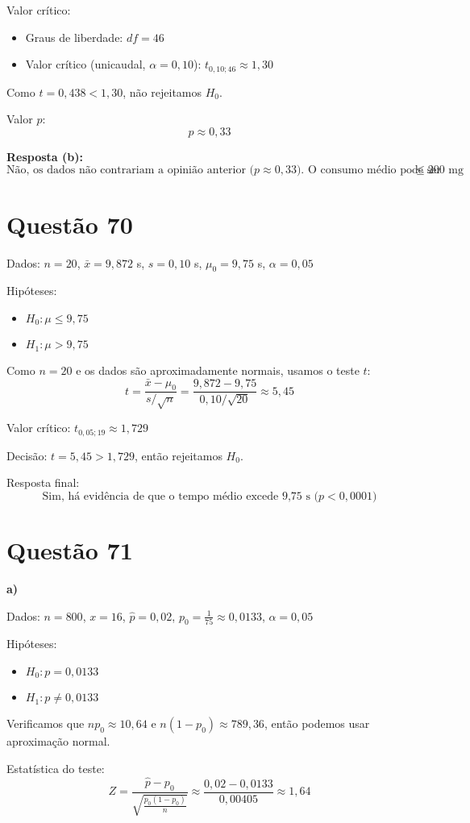 \documentclass[12pt]{article}
\newcommand{\quest}[1]{\section*{Questão #1}} %
\begin{document}
Valor crítico:
\begin{itemize}
  \item Graus de liberdade: $df = 46$
  \item Valor crítico (unicaudal, $\alpha = 0{,}10$): $t_{0{,}10; 46} \approx 1{,}30$
\end{itemize}

Como $t = 0{,}438 < 1{,}30$, não rejeitamos $H_0$.

Valor $p$:
\[
p \approx 0{,}33
\]

\textbf{Resposta (b):}
\[
\boxed{\text{Não, os dados não contrariam a opinião anterior ($p \approx 0{,}33$). O consumo médio pode ser } \leq 200 \text{ mg}}
\]





\quest{70}

Dados: $n = 20$, $\bar{x} = 9{,}872$ s, $s = 0{,}10$ s, $\mu_0 = 9{,}75$ s, $\alpha = 0{,}05$

Hip\'oteses:
\begin{itemize}
  \item $H_0: \mu \leq 9{,}75$
  \item $H_1: \mu > 9{,}75$
\end{itemize}

Como $n = 20$ e os dados s\~ao aproximadamente normais, usamos o teste $t$:
\[
t = \frac{\bar{x} - \mu_0}{s / \sqrt{n}} = \frac{9{,}872 - 9{,}75}{0{,}10 / \sqrt{20}} \approx 5{,}45
\]

Valor cr\'itico: $t_{0{,}05; 19} \approx 1{,}729$

Decis\~ao: $t = 5{,}45 > 1{,}729$, ent\~ao rejeitamos $H_0$.

Resposta final:
\[
\boxed{\text{Sim, h\'a evid\^encia de que o tempo m\'edio excede 9{,}75 s ($p < 0{,}0001$)}}
\] 

\quest{71}

\textbf{a)}

Dados: $n = 800$, $x = 16$, $\hat{p} = 0{,}02$, $p_0 = \frac{1}{75} \approx 0{,}0133$, $\alpha = 0{,}05$

Hipóteses:
\begin{itemize}
  \item $H_0: p = 0{,}0133$
  \item $H_1: p \neq 0{,}0133$
\end{itemize}

Verificamos que $np_0 \approx 10{,}64$ e $n(1 - p_0) \approx 789{,}36$, então podemos usar aproximação normal.

Estatística do teste:
\[
Z = \frac{\hat{p} - p_0}{\sqrt{\frac{p_0(1 - p_0)}{n}}} \approx \frac{0{,}02 - 0{,}0133}{0{,}00405} \approx 1{,}64
\]
\end{document}

